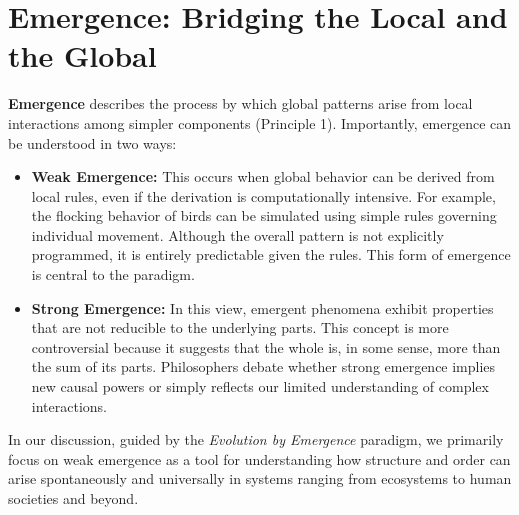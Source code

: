 \section*{Emergence: Bridging the Local and the Global}
\textbf{Emergence} describes the process by which global patterns arise from local interactions among simpler components (Principle 1). Importantly, emergence can be understood in two ways:
\begin{itemize}
    \item \textbf{Weak Emergence:} This occurs when global behavior can be derived from local rules, even if the derivation is computationally intensive. For example, the flocking behavior of birds can be simulated using simple rules governing individual movement. Although the overall pattern is not explicitly programmed, it is entirely predictable given the rules. This form of emergence is central to the paradigm.
    \item \textbf{Strong Emergence:} In this view, emergent phenomena exhibit properties that are not reducible to the underlying parts. This concept is more controversial because it suggests that the whole is, in some sense, more than the sum of its parts. Philosophers debate whether strong emergence implies new causal powers or simply reflects our limited understanding of complex interactions.
\end{itemize}
In our discussion, guided by the \emph{Evolution by Emergence} paradigm, we primarily focus on weak emergence as a tool for understanding how structure and order can arise spontaneously and universally in systems ranging from ecosystems to human societies and beyond. %

